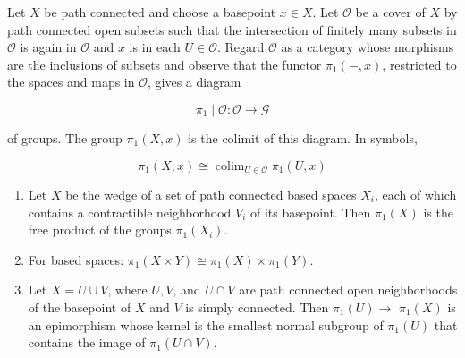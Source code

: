 \begin{theo}
Let $X$ be path connected and choose a basepoint $x \in X$. Let $\mathscr{O}$ be a cover of $X$ by path connected open subsets such that the intersection of finitely many subsets in $\mathscr{O}$ is again in $\mathscr{O}$ and $x$ is in each $U \in \mathscr{O}$. Regard $\mathscr{O}$ as a category whose morphisms are the inclusions of subsets and observe that the functor $\pi_1(-, x)$, restricted to the spaces and maps in $\mathcal{O}$, gives a diagram

    $$
    \pi_1 \mid \mathscr{O}: \mathscr{O} \longrightarrow \mathscr{G}
    $$
    
    of groups. The group $\pi_1(X, x)$ is the colimit of this diagram. In symbols,
    
    $$
    \pi_1(X, x) \cong \operatorname{colim}_{U \in \mathscr{O}} \pi_1(U, x)
    $$
        
\end{theo}

\begin{coro}
    \begin{enumerate}
        \item Let $X$ be the wedge of a set of path connected based spaces $X_i$, each of which contains a contractible neighborhood $V_i$ of its basepoint. Then $\pi_1(X)$ is the free product of the groups $\pi_1\left(X_i\right)$.
        \item For based spaces: $\pi_1(X \times Y) \cong \pi_1(X) \times \pi_1(Y)$.
        \item Let $X=U \cup V$, where $U, V$, and $U \cap V$ are path connected open neighborhoods of the basepoint of $X$ and $V$ is simply connected. Then $\pi_1(U) \longrightarrow$ $\pi_1(X)$ is an epimorphism whose kernel is the smallest normal subgroup of $\pi_1(U)$ that contains the image of $\pi_1(U \cap V)$.
    \end{enumerate}
\end{coro}







